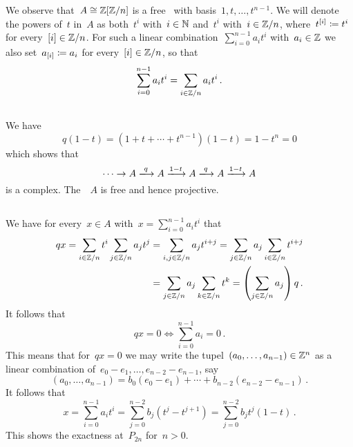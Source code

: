 \section{}


We observe that~$A \cong \mathbb{Z}[\mathbb{Z}/n]$ is a free~ with basis~$1, t, \dotsc, t^{n-1}$.
We will denote the powers of~$t$ in~$A$ as both~$t^i$ with~$i \in \mathbb{N}$ and~$t^i$ with~$i \in \mathbb{Z}/n$, where~$t^{[i]} \coloneqq t^i$ for every~$[i] \in \mathbb{Z}/n$.
For such a linear combination~$\sum_{i=0}^{n-1} a_i t^i$ with~$a_i \in \mathbb{Z}$ we also set~$a_{[i]} \coloneqq a_i$ for every~$[i] \in \mathbb{Z}/n$, so that
\[
  \sum_{i=0}^{n-1} a_i t^i
  =
  \sum_{i \in \mathbb{Z}/n} a_i t^i \,.
\]





\subsection{}

We have
\[
  q (1-t)
  =
  (1 + t + \dotsb + t^{n-1}) (1-t)
  =
  1 - t^n
  =
  0
\]
which shows that
\[
  \dotsb
  \to
  A
  \xlongto{q}
  A
  \xlongto{1-t}
  A
  \xlongto{q}
  A
  \xlongto{1-t}
  A
\]
is a complex.
The~{}~$A$ is free and hence projective.





\subsection{}

We have for every~$x \in A$ with~$x = \sum_{i=0}^{n-1} a_i t^i$ that
\begin{align*}
  qx
  =
  \sum_{i \in \mathbb{Z}/n} t^i
  \sum_{j \in \mathbb{Z}/n} a_j t^j
  &=
  \sum_{i,j \in \mathbb{Z}/n} a_j t^{i+j}
  =
  \sum_{j \in \mathbb{Z}/n} a_j \sum_{i \in \mathbb{Z}/n} t^{i+j}
  \\
  &=
  \sum_{ j \in \mathbb{Z}/n } a_j
  \sum_{ k \in \mathbb{Z}/n } t^k
  =
  \left( \sum_{ j \in \mathbb{Z}/n } a_j \right)
  q \,.
\end{align*}
It follows that
\[
  qx = 0
  \iff
  \sum_{i=0}^{n-1} a_i = 0 \,.
\]
This means that for~$qx = 0$ we may write the tupel~$(a_0, \dotsc, a_{n-1}) \in \mathbb{Z}^n$ as a linear combination of~$e_0 - e_1, \dotsc, e_{n-2} - e_{n-1}$, say
\[
  (a_0, \dotsc, a_{n-1})
  =
  b_0 (e_0 - e_1) + \dotsb + b_{n-2} (e_{n-2} - e_{n-1}) \,.
\]
It follows that
\[
  x
  =
  \sum_{i=0}^{n-1} a_i t^i
  =
  \sum_{j=0}^{n-2} b_j (t^j - t^{j+1})
  =
  \sum_{j=0}^{n-2} b_j t^j (1-t)  \,.
\]
This shows the exactness at~$P_{2n}$ for~$n > 0$.

